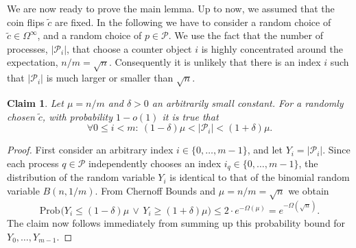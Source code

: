 \documentclass[11pt,letterpaper]{article}
\makeatletter
\newcommand{\bparen}[1]{{\bigl({#1}\bigr)}}
\providecommand{\@prob}{{\mathrm{Prob}}}
\newcommand{\bProb}[2][]{\@prob_{#1}\bparen{#2}}
\newtheorem{claim}[theorem]{Claim}
\newcommand{\PP}{\mathcal{P}}
\newcommand{\tc}{{\tilde{c}}}
\makeatother
\begin{document}
We are now ready to prove the main lemma.
Up to now, we assumed that the coin flips $\tc$ are fixed.
In the following we have to consider a random choice of $\tc\in\Omega^\infty$, and a random choice of $p\in\PP$.
We use the fact that the number of processes, $|\PP_i|$, that choose a counter object $i$ is highly concentrated around the expectation, $n/m=\sqrt{n}$.
Consequently it is unlikely that there is an index $i$ such that $|\PP_i|$ is much larger or smaller than $\sqrt{n}$.
\begin{claim}\label{clm:lb_expectations}
  Let $\mu=n/m$ and $\delta>0$ an arbitrarily small constant.
  For a randomly chosen $\tc$, with probability $1-o(1)$ it is true that
  \begin{displaymath}
    \forall 0\leq i<m:\ (1-\delta)\mu<|\PP_i|<(1+\delta)\mu.
  \end{displaymath}
\end{claim}
\begin{proof}
  First consider an arbitrary index $i\in\{0,\dots,m-1\}$, and let $Y_i=|\PP_i|$.
  Since each process $q\in\PP$ independently chooses an index $i_q\in\{0,\dots,m-1\}$, the distribution of the random variable $Y_i$ is identical to that of the binomial random variable $B(n,1/m)$.
  From Chernoff Bounds and $\mu=n/m=\sqrt{n}$ we obtain
  \begin{displaymath}
    \bProb{Y_i\leq (1-\delta)\mu\,\vee\,Y_i\geq (1+\delta)\mu}\leq
    2\cdot e^{-\Omega(\mu)}
    =
    e^{-\Omega(\sqrt{n})}.
  \end{displaymath}
  The claim now follows immediately from summing up this probability bound for $Y_0,\dots,Y_{m-1}$.
\end{proof}
\end{document}

